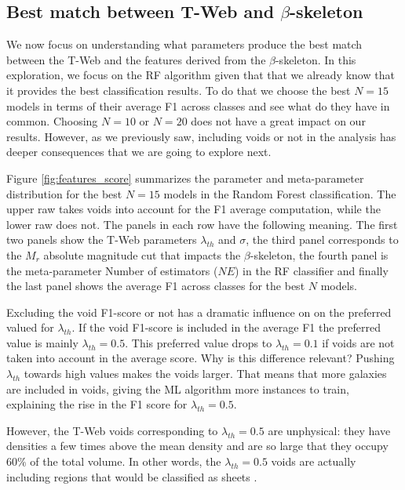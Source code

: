 \documentclass[usenatbib]{mnras}
\begin{document}
\subsection{Best match between T-Web and $\beta$-skeleton}

We now focus on understanding what parameters produce the best match between the T-Web and the features derived from the $\beta$-skeleton.
In this exploration, we focus on the RF algorithm given that that we already know that it 
provides the best classification results.
To do that we choose the best $N=15$ models in terms of their average F1 across
classes and see what do they have in common.
Choosing $N=10$ or $N=20$ does not have a great impact on our
results. 
However, as we previously saw, including voids or not in the analysis
has deeper consequences that we are going to explore next.

Figure \ref{fig:features_score} summarizes the parameter and meta-parameter
distribution for the best $N=15$ models in the Random Forest
classification.
The upper raw takes voids into account for the F1 average computation,
while the lower raw does not.
The panels in each row have the following meaning.
The first two panels show the T-Web parameters
$\lambda_{th}$ and $\sigma$, the third panel corresponds to the $M_r$
absolute magnitude cut that impacts the $\beta$-skeleton, the fourth panel is the meta-parameter Number of estimators ($NE$) in the RF
classifier and finally the last panel shows the average F1 across classes for the best $N$ models. 

Excluding the void F1-score or not has a dramatic influence on
on the preferred valued for $\lambda_{th}$. 
If the void F1-score is included in the average F1 the preferred value is mainly
$\lambda_{th}=0.5$. 
This preferred value drops to $\lambda_{th}=0.1$ if voids are not taken into account in the average score.
Why is this difference relevant?
Pushing $\lambda_{th}$ towards high values makes the voids larger.
That means that more galaxies are included in voids, giving the ML algorithm more instances to train, explaining the rise in the F1 score for $\lambda_{th}=0.5$.

However, the T-Web voids corresponding to $\lambda_{th}=0.5$ are unphysical: they have densities a few times above the mean
density and are so large that they occupy $60\%$ of the total volume.
In other words, the $\lambda_{th}=0.5$ voids are actually including regions that would be classified as sheets
\citep{Bustamante2015, Forero-Romero2009}. 
\end{document}
